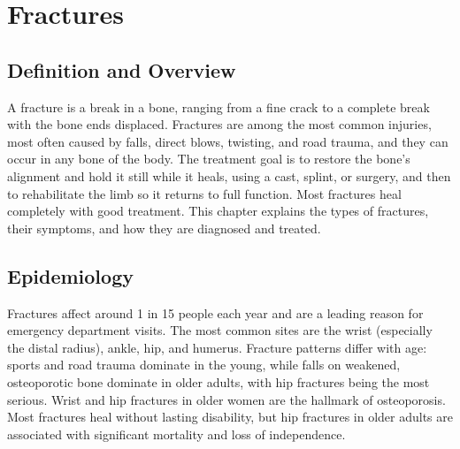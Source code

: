 \chapter{Fractures}

\section*{Definition and Overview}
A fracture is a break in a bone, ranging from a fine crack to a complete break with the bone ends displaced. Fractures are among the most common injuries, most often caused by falls, direct blows, twisting, and road trauma, and they can occur in any bone of the body. The treatment goal is to restore the bone's alignment and hold it still while it heals, using a cast, splint, or surgery, and then to rehabilitate the limb so it returns to full function. Most fractures heal completely with good treatment. This chapter explains the types of fractures, their symptoms, and how they are diagnosed and treated.

\section*{Epidemiology}
Fractures affect around 1 in 15 people each year and are a leading reason for emergency department visits. The most common sites are the wrist (especially the distal radius), ankle, hip, and humerus. Fracture patterns differ with age: sports and road trauma dominate in the young, while falls on weakened, osteoporotic bone dominate in older adults, with hip fractures being the most serious. Wrist and hip fractures in older women are the hallmark of osteoporosis. Most fractures heal without lasting disability, but hip fractures in older adults are associated with significant mortality and loss of independence.

